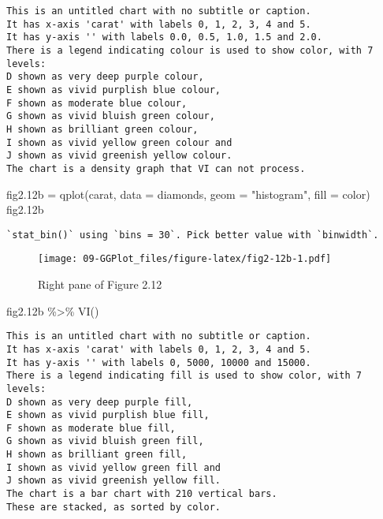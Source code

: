 \documentclass[
]{book}
\newenvironment{Shaded}{\begin{snugshade}}{\end{snugshade}}
\newcommand{\AttributeTok}[1]{\textcolor[rgb]{0.77,0.63,0.00}{#1}}
\newcommand{\FloatTok}[1]{\textcolor[rgb]{0.00,0.00,0.81}{#1}}
\newcommand{\FunctionTok}[1]{\textcolor[rgb]{0.00,0.00,0.00}{#1}}
\newcommand{\NormalTok}[1]{#1}
\newcommand{\OtherTok}[1]{\textcolor[rgb]{0.56,0.35,0.01}{#1}}
\newcommand{\SpecialCharTok}[1]{\textcolor[rgb]{0.00,0.00,0.00}{#1}}
\newcommand{\StringTok}[1]{\textcolor[rgb]{0.31,0.60,0.02}{#1}}
\begin{document}
\begin{verbatim}
This is an untitled chart with no subtitle or caption.
It has x-axis 'carat' with labels 0, 1, 2, 3, 4 and 5.
It has y-axis '' with labels 0.0, 0.5, 1.0, 1.5 and 2.0.
There is a legend indicating colour is used to show color, with 7 levels:
D shown as very deep purple colour, 
E shown as vivid purplish blue colour, 
F shown as moderate blue colour, 
G shown as vivid bluish green colour, 
H shown as brilliant green colour, 
I shown as vivid yellow green colour and 
J shown as vivid greenish yellow colour.
The chart is a density graph that VI can not process.
\end{verbatim}

\begin{Shaded}
\begin{Highlighting}[]
\NormalTok{fig2}\FloatTok{.12}\NormalTok{b }\OtherTok{=} \FunctionTok{qplot}\NormalTok{(carat, }\AttributeTok{data =}\NormalTok{ diamonds, }\AttributeTok{geom =} \StringTok{"histogram"}\NormalTok{, }\AttributeTok{fill =}\NormalTok{ color)    }
\NormalTok{fig2}\FloatTok{.12}\NormalTok{b}
\end{Highlighting}
\end{Shaded}

\begin{verbatim}
`stat_bin()` using `bins = 30`. Pick better value with `binwidth`.
\end{verbatim}

\begin{figure}
\centering
\texttt{[image: 09-GGPlot\_files/figure-latex/fig2-12b-1.pdf]}
\caption{\label{fig:fig2-12b}Right pane of Figure 2.12}
\end{figure}

\begin{Shaded}
\begin{Highlighting}[]
\NormalTok{fig2}\FloatTok{.12}\NormalTok{b }\SpecialCharTok{\%\textgreater{}\%} \FunctionTok{VI}\NormalTok{()   }
\end{Highlighting}
\end{Shaded}

\begin{verbatim}
This is an untitled chart with no subtitle or caption.
It has x-axis 'carat' with labels 0, 1, 2, 3, 4 and 5.
It has y-axis '' with labels 0, 5000, 10000 and 15000.
There is a legend indicating fill is used to show color, with 7 levels:
D shown as very deep purple fill, 
E shown as vivid purplish blue fill, 
F shown as moderate blue fill, 
G shown as vivid bluish green fill, 
H shown as brilliant green fill, 
I shown as vivid yellow green fill and 
J shown as vivid greenish yellow fill.
The chart is a bar chart with 210 vertical bars.
These are stacked, as sorted by color.
\end{verbatim}
\end{document}
